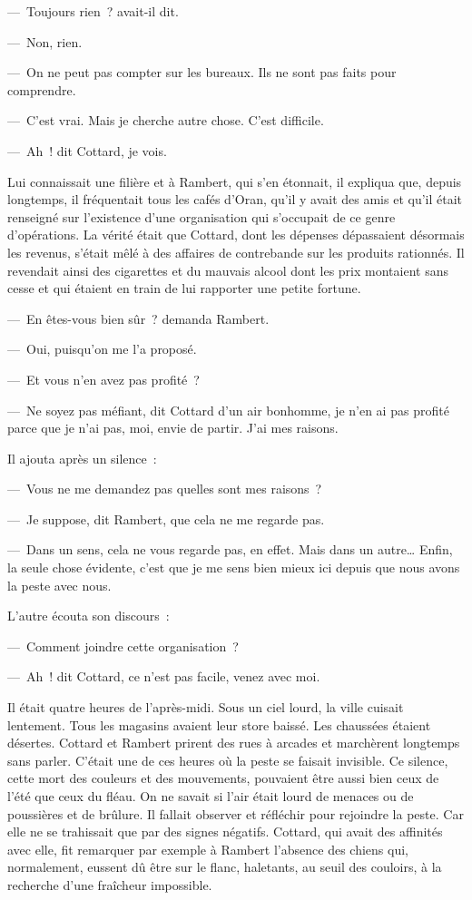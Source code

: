 \documentclass[french,twoside]{book} %
\begin{document}
— Toujours rien ? avait-il dit.\par
— Non, rien.\par
— On ne peut pas compter sur les bureaux. Ils ne sont pas faits pour comprendre.\par
— C’est vrai. Mais je cherche autre chose. C’est difficile.\par
— Ah ! dit Cottard, je vois.\par
Lui connaissait une filière et à Rambert, qui s’en étonnait, il expliqua que, depuis longtemps, il fréquentait tous les cafés d’Oran, qu’il y avait des amis et qu’il était renseigné sur l’existence d’une organisation qui s’occupait de ce genre d’opérations. La vérité était que Cottard, dont les dépenses dépassaient désormais les revenus, s’était mêlé à des affaires de contrebande sur les produits rationnés. Il revendait ainsi des cigarettes et du mauvais alcool dont les prix montaient sans cesse et qui étaient en train de lui rapporter une petite fortune.\par
— En êtes-vous bien sûr ? demanda Rambert.\par
— Oui, puisqu’on me l’a proposé.\par
— Et vous n’en avez pas profité ?\par
— Ne soyez pas méfiant, dit Cottard d’un air bonhomme, je n’en ai pas profité parce que je n’ai pas, moi, envie de partir. J’ai mes raisons.\par
Il ajouta après un silence :\par
— Vous ne me demandez pas quelles sont mes raisons ?\par
— Je suppose, dit Rambert, que cela ne me regarde pas.\par
— Dans un sens, cela ne vous regarde pas, en effet. Mais dans un autre… Enfin, la seule chose évidente, c’est que je me sens bien mieux ici depuis que nous avons la peste avec nous.\par
L’autre écouta son discours :\par
— Comment joindre cette organisation ?\par
— Ah ! dit Cottard, ce n’est pas facile, venez avec moi.\par
Il était quatre heures de l’après-midi. Sous un ciel lourd, la ville cuisait lentement. Tous les magasins avaient leur store baissé. Les chaussées étaient désertes. Cottard et Rambert prirent des rues à arcades et marchèrent longtemps sans parler. C’était une de ces heures où la peste se faisait invisible. Ce silence, cette mort des couleurs et des mouvements, pouvaient être aussi bien ceux de l’été que ceux du fléau. On ne savait si l’air était lourd de menaces ou de poussières et de brûlure. Il fallait observer et réfléchir pour rejoindre la peste. Car elle ne se trahissait que par des signes négatifs. Cottard, qui avait des affinités avec elle, fit remarquer par exemple à Rambert l’absence des chiens qui, normalement, eussent dû être sur le flanc, haletants, au seuil des couloirs, à la recherche d’une fraîcheur impossible.\par
\end{document}
